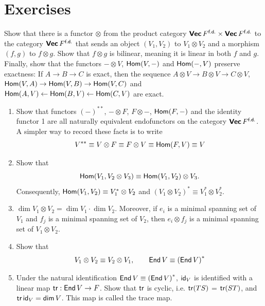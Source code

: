 \clearpage{}

\section{Exercises}

\begin{problem}
Show that there is a functor $\otimes$ from the product category $\Vect{F}^{\fd} \times \Vect{F}^{\fd}$ to the category $\Vect{F}^{\fd}$ that sends an object $(V_1, V_2)$ to $V_1 \otimes V_2$ and a morphism $(f, g)$ to $f \otimes g$. Show that $f \otimes g$ is bilinear, meaning it is linear in both $f$ and $g$. Finally, show that the functors $- \otimes V$, $\Hom(V, -)$ and $\Hom(-, V)$ preserve exactness: If $A \to B \to C$ is exact, then the sequence $A \otimes V \to B \otimes V \to C \otimes V$, $\Hom(V, A) \to \Hom(V, B) \to \Hom(V, C)$ and $\Hom(A, V) \leftarrow \Hom(B, V) \leftarrow \Hom(C, V)$ are exact.
\end{problem}

\begin{problem}
\begin{enumerate}
	\item Show that functors ${(-)}^{**}$, $- \otimes F$, $F \otimes -$, $\Hom(F, -)$ and the identity functor 1 are all naturally equivalent endofunctors on the category $\Vect{F}^{\fd}$. A simpler way to record these facts is to write
	      \[
		      V^{**} \equiv V \otimes F \equiv F \otimes V \equiv \Hom(F, V) \equiv V
	      \]

	\item Show that
	      \[
		      \Hom(V_1, V_2 \otimes V_3) \equiv \Hom(V_1, V_2) \otimes V_3.
	      \]
	      Consequently, $\Hom(V_1, V_2) \equiv V_1^* \otimes V_2$ and ${(V_1 \otimes V_2)}^* \equiv V_1^* \otimes V_2^*$.

	\item $\dim V_1 \otimes V_2 = \dim V_1 \cdot \dim V_2$. Moreover, if $e_i$ is a minimal spanning set of $V_1$ and $f_j$ is a minimal spanning set of $V_2$, then $e_i \otimes f_j$ is a minimal spanning set of $V_1 \otimes V_2$.

	\item Show that
	      \[
		      V_1 \otimes V_2 \equiv V_2 \otimes V_1, \qquad \End V \equiv {(\End V)}^*
	      \]

	\item Under the natural identification $\End V \equiv {(\End V)}^*$, $\id_V$ is identified with a linear map $\tr: \End V \to F$. Show that $\tr$ is cyclic, i.e. $\tr(TS)$ = $\tr(ST)$, and $\tr\id_V = \dim V$. This map is called the trace map.
\end{enumerate}
\end{problem}

